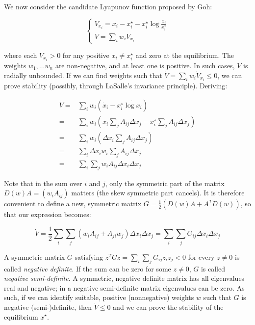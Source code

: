 \documentclass{article}
\begin{document}
We now consider the candidate Lyapunov function proposed by Goh:

\begin{equation}
\label{eq:goh}
\begin{cases}
V_{x_i} = x_i - x_i^\star - x_i^\star \log \frac{x_i}{x_i^\star}\\
V = \sum_i w_i V_{x_i}
\end{cases}
\end{equation}

where each \(V_{x_i} > 0\) for any positive \(x_i \neq x_i^\star\) and
zero at the equilibrium. The weights \(w_1, \ldots w_n\) are
non-negative, and at least one is positive. In such cases, \(V\) is
radially unbounded. If we can find weights such that
\(\dot{V} = \sum_i w_i \dot{V}_{x_i} \leq 0\), we can prove stability
(possibly, through LaSalle's invariance principle). Deriving:

\begin{equation}
\label{eq:gohstab}
\begin{aligned}
\dot{V} =& \sum_i w_i \left(\dot{x}_i - x_i^\star \dot{\log x_i} \right)\\
 =& \sum_i w_i \left(x_i \sum_{j} A_{ij} \Delta x_j - x_i^\star \sum_j A_{ij} \Delta x_j \right)\\
 =& \sum_i w_i \left(\Delta x_i \sum_{j} A_{ij} \Delta x_j \right)\\
 =& \sum_i \Delta x_i w_i \sum_j A_{ij} \Delta x_j\\
 =& \sum_i \sum_j w_i A_{ij} \Delta x_i \Delta x_j
\end{aligned}
\end{equation}

Note that in the sum over \(i\) and \(j\), only the symmetric part of
the matrix \(D(w) A = (w_i A_{ij})\) matters (the skew symmetric part
cancels). It is therefore convenient to define a new, symmetric matrix
\(G =\frac{1}{2} (D(w)A + A^T D(w))\), so that our expression becomes:

\begin{equation}
\label{eq:stabcond}
\dot{V} = \frac{1}{2}\sum_i \sum_j (w_i A_{ij} + A_{ji} w_j) \Delta x_i \Delta x_j = \sum_i \sum_j G_{ij} \Delta x_i \Delta x_j
\end{equation}

A symmetric matrix \(G\) satisfying
\(z^T G z = \sum_i \sum_j G_{ij} z_i z_j < 0\) for every \(z \neq 0\) is
called \emph{negative definite}. If the sum can be zero for some
\(z \neq 0\), \(G\) is called \emph{negative semi-definite}. A
symmetric, negative definite matrix has all eigenvalues real and
negative; in a negative semi-definite matrix eigenvalues can be zero. As
such, if we can identify suitable, positive (nonnegative) weights \(w\)
such that \(G\) is negative (semi-)definite, then \(\dot{V} \leq 0\) and
we can prove the stability of the equilibrium \(x^\star\).
\end{document}
